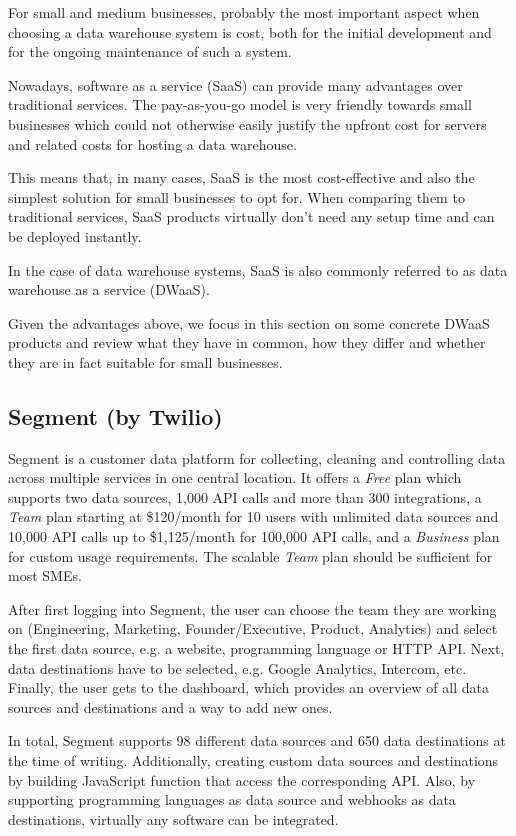 \documentclass[../paper.tex]{subfiles}
\begin{document}
For small and medium businesses, probably the most important aspect when
choosing a data warehouse system is cost, both for the initial development and
for the ongoing maintenance of such a system.

Nowadays, software as a service (SaaS) can provide many advantages over
traditional services. The pay-as-you-go model is very friendly towards small
businesses which could not otherwise easily justify the upfront cost for
servers and related costs for hosting a data warehouse.

This means that, in many cases, SaaS is the most cost-effective and also the
simplest solution for small businesses to opt for. When comparing them to
traditional services, SaaS products virtually don't need any setup time and
can be deployed instantly.

In the case of data warehouse systems, SaaS is also commonly referred to as
data warehouse as a service (DWaaS).

Given the advantages above, we focus in this section on some concrete DWaaS
products and review what they have in common, how they differ and whether they
are in fact suitable for small businesses.

\subsection{Segment (by Twilio)}

Segment is a customer data platform for collecting, cleaning and controlling
data across multiple services in one central location. It offers a
\textit{Free} plan which supports two data sources, 1,000 API calls and more
than 300 integrations, a \textit{Team} plan starting at \$120/month for 10
users with unlimited data sources and 10,000 API calls up to \$1,125/month for
100,000 API calls, and a \textit{Business} plan for custom usage requirements.
The scalable \textit{Team} plan should be sufficient for most SMEs.

After first logging into Segment, the user can choose the team they are working
on (Engineering, Marketing, Founder/Executive, Product, Analytics) and select
the first data source, e.g. a website, programming language or HTTP API. Next,
data destinations have to be selected, e.g. Google Analytics, Intercom, etc.
Finally, the user gets to the dashboard, which provides an overview of all data
sources and destinations and a way to add new ones.

In total, Segment supports 98 different data sources and 650 data destinations
at the time of writing. Additionally, creating custom data sources and
destinations by building JavaScript function that access the corresponding API.
Also, by supporting programming languages as data source and webhooks as data
destinations, virtually any software can be integrated.
\end{document}
